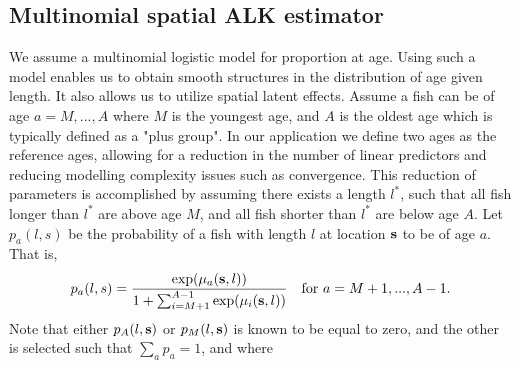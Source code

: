 \documentclass[a4paper 12pt]{article}
\numberwithin{equation}{section}
\begin{document}


\subsection{\large Multinomial spatial ALK  estimator}
\label{sec:spatialModelALK}
We assume a multinomial logistic model for proportion at age. Using such a model enables us to obtain smooth structures in the distribution of age given length. It also allows us to utilize spatial latent effects. Assume a fish can be of age $a = M,...,A$ where $M$ is the youngest age, and $A$ is the oldest age which is typically defined as a "plus group". In our application we define two ages as the reference ages, allowing for a reduction in the number of linear predictors and reducing modelling complexity issues such as convergence. This reduction of parameters is accomplished by assuming there exists a length $l^*$, such that all fish longer than $l^*$ are above age $M$, and all fish shorter than $l^*$ are below age $A$. Let $p_a(l,s)$ be the probability of a fish with length $l$ at location ${\bf s}$ to be of age $a$. That is,
\begin{equation}
p_a(l,s) = \frac{\exp(\mu_a({\bf s},l))}{1+ \sum_{i = M+1}^{A-1} \exp(\mu_i({\bf s},l))} \vspace{ 4mm} \ \ \ \text{for } a =M+1,...,A-1.
\end{equation}
Note that either $p_{A}(l,{\bf s})$ or $p_{M}(l,{\bf s})$ is known to be equal to zero, and the other is selected such that $\sum_a p_a = 1$, and where
\end{document}
